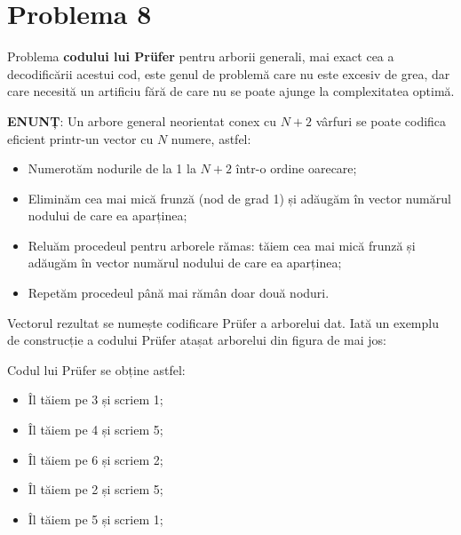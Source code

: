 \section{Problema 8}

Problema {\bf codului lui Prüfer} pentru arborii generali, mai exact cea a
decodificării acestui cod, este genul de problemă care nu este excesiv de
grea, dar care necesită un artificiu fără de care nu se poate ajunge la
complexitatea optimă.

{\bf ENUNȚ}: Un arbore general neorientat conex cu $N+2$ vârfuri se poate
codifica eficient printr-un vector cu $N$ numere, astfel:

\begin{itemize}

\item Numerotăm nodurile de la 1 la $N+2$ într-o ordine oarecare;

\item Eliminăm cea mai mică frunză (nod de grad 1) și adăugăm în vector
  numărul nodului de care ea aparținea;

\item Reluăm procedeul pentru arborele rămas: tăiem cea mai mică frunză și
  adăugăm în vector numărul nodului de care ea aparținea;

\item Repetăm procedeul până mai rămân doar două noduri.

\end{itemize}

Vectorul rezultat se numește codificare Prüfer a arborelui dat. Iată un
exemplu de construcție a codului Prüfer atașat arborelui din figura de mai
jos:


Codul lui Prüfer se obține astfel:

\begin{itemize}

\item Îl tăiem pe 3 și scriem 1;

\item Îl tăiem pe 4 și scriem 5;

\item Îl tăiem pe 6 și scriem 2;

\item Îl tăiem pe 2 și scriem 5;

\item Îl tăiem pe 5 și scriem 1;

\end{itemize}


